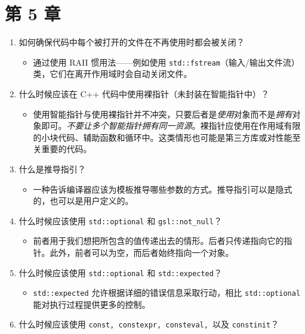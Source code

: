 \section*{第 5 章}

\begin{enumerate}
\item 如何确保代码中每个被打开的文件在不再使用时都会被关闭？

\begin{itemize}
\item 通过使用 RAII 惯用法——例如使用 \texttt{std::\allowbreak{}fstream}（输入/输出文件流）类，它们在离开作用域时会自动关闭文件。
\end{itemize}
\item 什么时候应该在 C++ 代码中使用裸指针（未封装在智能指针中）？

\begin{itemize}
\item 使用智能指针与使用裸指针并不冲突，只要后者是\emph{使用}对象而不是\emph{拥有}对象即可。\emph{不要让多个智能指针拥有同一资源}。裸指针应使用在作用域有限的小块代码、辅助函数和循环中。这类情形也可能是第三方库或对性能至关重要的代码。
\end{itemize}
\item 什么是推导指引？

\begin{itemize}
\item 一种告诉编译器应该为模板推导哪些参数的方式。推导指引可以是隐式的，也可以是用户定义的。
\end{itemize}
\item 什么时候应该使用 \texttt{std::\allowbreak{}optional} 和 \texttt{gsl::\allowbreak{}not\_\allowbreak{}null}？

\begin{itemize}
\item 前者用于我们想把所包含的值传递出去的情形。后者只传递指向它的指针。此外，前者可以为空，而后者始终指向一个对象。
\end{itemize}
\item 什么时候应该使用 \texttt{std::\allowbreak{}optional} 和 \texttt{std::\allowbreak{}expected}？

\begin{itemize}
\item \texttt{std::\allowbreak{}expected} 允许根据详细的错误信息采取行动，相比 \texttt{std::\allowbreak{}optional} 能对执行过程提供更多的控制。
\end{itemize}
\item 什么时候应该使用 \texttt{const,\allowbreak{} constexpr,\allowbreak{} consteval,\allowbreak{} }以及 \texttt{constinit}？


\end{enumerate}
